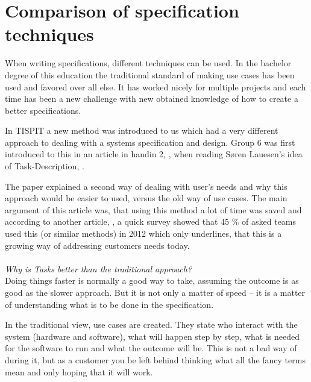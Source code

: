 \documentclass[Main]{subfiles}
\begin{document}
\section{Comparison of specification techniques}


When writing specifications, different techniques can be used.
In the bachelor degree of this education the traditional standard of making use cases has been used and favored over all else.
It has worked nicely for multiple projects and each time has been a new challenge with new obtained knowledge of how to create a better specifications.

In TISPIT a new method was introduced to us which had a very different approach to dealing with a systems specification and design.
Group 6 was first introduced to this in an article in handin 2, \parencite[]{HI2}, when reading Søren Lauesen's idea of Task-Description, \parencite[]{Task}.

The paper explained a second way of dealing with user's needs and why this approach would be easier to used, versus the old way of use cases.
The main argument of this article was, that using this method a lot of time was saved and according to another article, \parencite[]{Task2}, a quick survey showed that 45 \% of asked teams used this (or similar methods) in 2012 which only underlines, that this is a growing way of addressing customers needs today.
\\
\\
\textit{Why is Tasks better than the traditional approach?}
\\
Doing things faster is normally a good way to take, assuming the outcome is as good as the slower approach.
But it is not only a matter of speed -- it is a matter of understanding what is to be done in the specification.

In the traditional view, use cases are created.
They state who interact with the system (hardware and software), what will happen step by step, what is needed for the software to run and what the outcome will be.
This is not a bad way of during it, but as a customer you be left behind thinking what all the fancy terms mean and only hoping that it will work.
\end{document}
